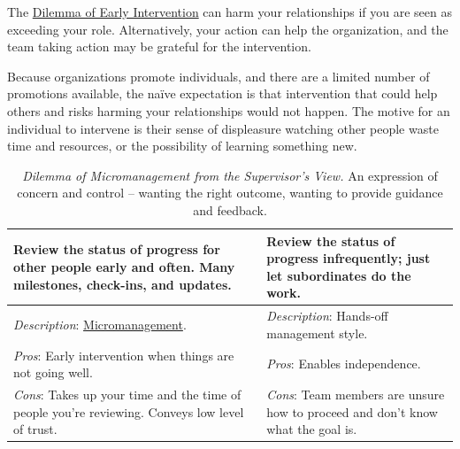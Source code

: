 The \hyperref[table:dilemma-personal-early-intervention]{Dilemma of Early Intervention} can harm your relationships if you are seen as exceeding your role. Alternatively, your action can help the organization, and the team taking  action may be grateful for the intervention. 

Because organizations promote individuals, and there are a limited number of promotions available, the na\"ive expectation is that intervention that could help others and risks harming your relationships would not happen. The motive for an individual to intervene is their sense of displeasure watching other people waste time and resources, or the possibility of learning something new.


\begin{center}
\begin{table}[H] %
\begin{tabular}{ | m{\dilemmatablewidth}| m{\dilemmatablewidth} | } 
  \hline
  \textbf{Review the status of progress for other people early and often. Many milestones, check-ins, and updates.} &
  \textbf{Review the status of progress infrequently; just let subordinates do the work.} \\
  \hline
  \textit{Description}: \href{https://en.wikipedia.org/wiki/Micromanagement}{Micromanagement}. 
  \index{Wikipedia!micromanagement@\href{https://en.wikipedia.org/wiki/Micromanagement}{micromanagement}}
  & 
  \textit{Description}: Hands-off management style. \\
  \hline
  \textit{Pros}: Early intervention when things are not going well. & 
  \textit{Pros}: Enables independence. \\
  \hline
  \textit{Cons}: Takes up your time and the time of people you're reviewing. Conveys low level of trust. & 
  \textit{Cons}: Team members are unsure how to proceed and don't know what the goal is. \\
  \hline
\end{tabular}
\caption{\textit{Dilemma of Micromanagement from the Supervisor's View.}
An expression of concern and control -- wanting the right outcome, wanting to provide guidance and feedback. 
}
\label{table:dilemma-personal-manager-micromanaging}
\end{table}
\end{center}

